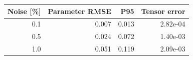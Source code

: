 \begin{tabular}{rrrr}
\toprule
Noise [\%] & Parameter RMSE & P95 & Tensor error \\
\midrule
0.1 & 0.007 & 0.013 & 2.82e-04 \\
0.5 & 0.024 & 0.072 & 1.40e-03 \\
1.0 & 0.051 & 0.119 & 2.09e-03 \\
\bottomrule
\end{tabular}
